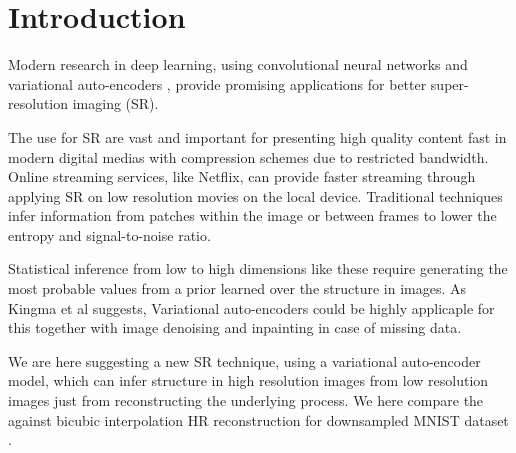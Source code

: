 \section{Introduction}
\label{sec:introduction}
Modern research in deep learning, using convolutional neural networks \cite{Dong15} and variational auto-encoders \cite{Kingma2013, Johnson16}, provide promising applications for better super-resolution imaging (SR).  

The use for SR are vast and important for presenting high quality content fast in modern digital medias with compression schemes due to restricted bandwidth. Online streaming services, like Netflix, can provide faster streaming through applying SR on low resolution movies on the local device. Traditional techniques infer information from patches within the image or between frames to lower the entropy and signal-to-noise ratio. 

Statistical inference from low to high dimensions like these require generating the most probable values from a prior learned over the structure in images. As Kingma et al \cite{Kingma2013} suggests, Variational auto-encoders could be highly applicaple for this together with image denoising and inpainting in case of missing data.

We are here suggesting a new SR technique, using a variational auto-encoder model, which can infer structure in high resolution images from low resolution images just from reconstructing the underlying process. We here compare the against bicubic interpolation HR reconstruction for downsampled MNIST dataset \cite{MNIST}.
 